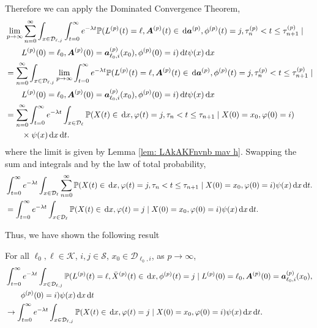 Therefore we can apply the Dominated Convergence Theorem, 
\begin{align}
	&\lim_{p\to\infty} \sum_{n=0}^\infty\int_{x\in\mathcal D_{\ell,j}}\int_{t=0}^\infty e^{-\lambda t} \mathbb P(L^{(p)}(t) = \ell, \boldsymbol A^{(p)}(t) \in \, \mathrm{d} \boldsymbol a^{(p)}, \phi^{(p)}(t) = j, \tau_{n}^{(p)}< t \leq\tau_{n+1}^{(p)} \mid \nonumber 
	\\&\qquad{}L^{(p)}(0)=\ell_0, \boldsymbol A^{(p)}(0)=\boldsymbol  a_{\ell_0,i}^{(p)}(x_0), \phi^{(p)}(0)=i)\, \mathrm{d} t \psi(x) \, \mathrm{d} x \nonumber
	\\&= \sum_{n=0}^\infty\int_{x\in\mathcal D_{\ell,j}}\lim_{p\to\infty} \int_{t=0}^\infty e^{-\lambda t} \mathbb P(L^{(p)}(t) = \ell, \boldsymbol A^{(p)}(t) \in \, \mathrm{d} \boldsymbol a^{(p)}, \phi^{(p)}(t) = j, \tau_{n}^{(p)}< t \leq\tau_{n+1}^{(p)} \mid \nonumber 
	\\&\qquad{}L^{(p)}(0)=\ell_0, \boldsymbol A^{(p)}(0)=\boldsymbol  a_{\ell_0,i}^{(p)}(x_0), \phi^{(p)}(0)=i)\, \mathrm{d} t \psi(x) \, \mathrm{d} x \nonumber
	\\&= \sum_{n=0}^\infty\int_{t=0}^\infty e^{-\lambda t}  \int_{x\in\mathcal{D}_\ell}\mathbb P(X(t)\in\, \mathrm{d} x, \varphi(t)=j, \tau_n < t \leq \tau_{n+1}  
	\mid X(0)=x_0, \varphi(0)=i) \nonumber 
	\\&\qquad{}\times \psi(x)\, \mathrm{d} x\, \mathrm{d} t. \nonumber
\end{align}
where the limit is given by Lemma \ref{lem: LAkAKFnvnb mav h}. Swapping the sum and integrals and by the law of total probability, 
\begin{align}
	& \int_{t=0}^\infty e^{-\lambda t}  \int_{x\in\mathcal{D}_\ell}\sum_{n=0}^\infty\mathbb P(X(t)\in\, \mathrm{d} x, \varphi(t)=j, \tau_n < t \leq \tau_{n+1}  
	\mid X(0)=x_0, \varphi(0)=i)\psi(x)\, \mathrm{d} x\, \mathrm{d} t. \nonumber
	\\&= \int_{t=0}^\infty e^{-\lambda t}  \int_{x\in\mathcal{D}_\ell} \mathbb P(X(t)\in\, \mathrm{d} x, \varphi(t)=j  
	\mid X(0)=x_0, \varphi(0)=i)\psi(x)\, \mathrm{d} x\, \mathrm{d} t. \nonumber
\end{align}

Thus, we have shown the following result
\begin{lem}\label{lem: KajPOw}
	For all \(\ell_0,\ell\in\mathcal K\), \(i,j\in\mathcal S\), \(x_0\in\mathcal D_{\ell_0,i}\), as \(p\to\infty\), 
	\begin{align}
		&\int_{t=0}^\infty e^{-\lambda t}\int_{x\in\mathcal D_{\ell,j}}\mathbb P(L^{(p)}(t) = \ell, \bar X^{(p)}(t) \in \, \mathrm{d} x, \phi^{(p)}(t) = j \mid L^{(p)}(0)=\ell_0, \boldsymbol A^{(p)}(0)=\boldsymbol  a_{\ell_0,i}^{(p)}(x_0), \nonumber 
	\\&\qquad{}\phi^{(p)}(0)=i)  \psi(x)\, \mathrm{d} x\, \mathrm{d} t \nonumber
		\\&\to \int_{t=0}^\infty e^{-\lambda t}  \int_{x\in\mathcal{D}_{\ell,j}} \mathbb P(X(t)\in\, \mathrm{d} x, \varphi(t)=j  
		\mid X(0)=x_0, \varphi(0)=i)\psi(x)\, \mathrm{d} x\, \mathrm{d} t. \nonumber
	\end{align}
\end{lem}

